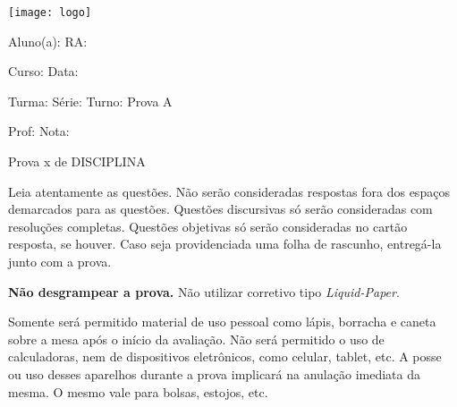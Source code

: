\documentclass[a4paper]{article}
\begin{document}
\noindent\parbox[c]{.15\textwidth}{\texttt{[image: logo]}}\hfill
\parbox[c]{.825\textwidth}{\raggedright%
{Aluno(a): \underline{\hspace{8.5cm}} RA: \underline{\hspace{2.3cm}}\par}
{Curso: \underline{\hspace{8.95cm}} Data: \underline{\hspace{2cm}}\par}
{Turma: \underline{\hspace{2cm}} Série: \underline{\hspace{2cm}}
  Turno: \underline{\hspace{2.5cm}} Prova A\par}
{Prof: \underline{\hspace{9.15cm}} Nota: \underline{\hspace{2cm}}\par}

\vspace{10pt}
}

{\large Prova x de DISCIPLINA}

\vspace{10pt}


Leia atentamente as questões. Não serão consideradas respostas fora
dos espaços demarcados para as questões. Questões discursivas só serão
consideradas com resoluções completas. Questões objetivas só serão
consideradas no cartão resposta, se houver. Caso seja providenciada
uma folha de rascunho, entregá-la junto com a prova.

{\bf Não desgrampear a prova.} Não utilizar corretivo tipo {\em
  Liquid-Paper}.

Somente será permitido material de uso pessoal como lápis, borracha e
caneta sobre a mesa após o início da avaliação. Não será permitido o
uso de calculadoras, nem de dispositivos eletrônicos, como celular,
tablet, etc. A posse ou uso desses aparelhos durante a prova implicará
na anulação imediata da mesma. O mesmo vale para bolsas, estojos, etc.

\vspace{0.1cm}
\hrulefill
\vspace{0.3cm}
\end{document}
